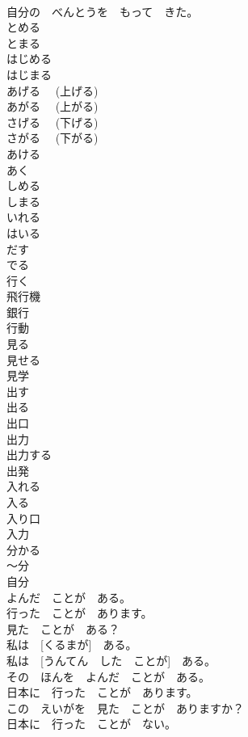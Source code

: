 \documentclass[8pt]{extreport}
\begin{document}
\begin{CJK}{UTF8}{min}
\\	自分の　べんとうを　もって　きた。	
\\	とめる	
\\	とまる	
\\	はじめる	
\\	はじまる	
\\	あげる　 (上げる)	
\\	あがる　 (上がる)	
\\	さげる　 (下げる)	
\\	さがる　 (下がる)	
\\	あける	
\\	あく	
\\	しめる	
\\	しまる	
\\	いれる	
\\	はいる	
\\	だす	
\\	でる	
\\	行く	
\\	飛行機	
\\	銀行	
\\	行動	
\\	見る	
\\	見せる	
\\	見学	
\\	出す	
\\	出る	
\\	出口	
\\	出力	
\\	出力する	
\\	出発	
\\	入れる	
\\	入る	
\\	入り口	
\\	入力	
\\	分かる	
\\	～分	
\\	自分	
\\	よんだ　ことが　ある。	
\\	行った　ことが　あります。	
\\	見た　ことが　ある？	
\\	私は　[くるまが]　ある。	
\\	私は　[うんてん　した　ことが]　ある。	
\\	その　ほんを　よんだ　ことが　ある。	
\\	日本に　行った　ことが　あります。	
\\	この　えいがを　見た　ことが　ありますか？	
\\	日本に　行った　ことが　ない。	

\end{CJK}
\end{document}
